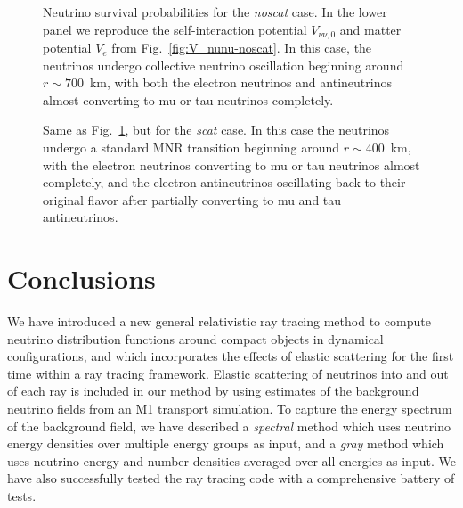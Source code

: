 \documentclass[aps,floatfix,prd,superscriptaddress,twocolumn]{revtex4-1}
\begin{document}
\begin{figure}
  \resizebox{\columnwidth}{!}{}
  \caption{Neutrino survival probabilities for the \emph{noscat} case.
    In the lower panel we reproduce the self-interaction potential $V_{\nu\nu,0}$
    and matter potential $V_e$ from Fig.~\ref{fig:V_nunu-noscat}.
    In this case, the neutrinos undergo collective neutrino oscillation
    beginning around $r\sim700$~km,
    with both the electron neutrinos and antineutrinos almost converting to mu
    or tau neutrinos completely.
  }
  \label{fig:survival-noscat}
\end{figure}

\begin{figure}
  \resizebox{\columnwidth}{!}{}
  \caption{Same as Fig.~\ref{fig:survival-noscat},
    but for the \emph{scat} case.
    In this case the neutrinos undergo a standard MNR transition
    beginning around $r\sim400$~km,
    with the electron neutrinos converting to mu or tau neutrinos almost
    completely,
    and the electron antineutrinos oscillating back to their original flavor
    after partially converting to mu and tau antineutrinos.
  }
  \label{fig:survival-scat}
\end{figure}

\section{Conclusions}
\label{sec:conclusions}
We have introduced a new general relativistic ray tracing method to compute
neutrino distribution functions around compact objects in dynamical configurations,
and which incorporates the effects of elastic scattering for the first time
within a ray tracing framework.
Elastic scattering of neutrinos into and out of each ray is included in our
method by using estimates of the background neutrino fields from an
M1 transport simulation.
To capture the energy spectrum of the background field, we have described a
\emph{spectral} method which uses neutrino energy densities over multiple
energy groups as input, and a
\emph{gray} method which uses neutrino energy and number densities averaged
over all energies as input.
We have also successfully tested the ray tracing code with a comprehensive
battery of tests.
\end{document}

